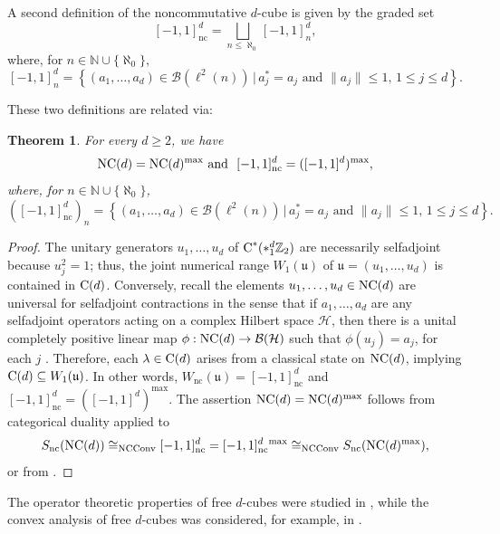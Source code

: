 \documentclass{amsart}
\newtheorem{theorem}{Theorem}[section]
\theoremstyle{definition}
\theoremstyle{remark}
\newcommand{\B}{\mathcal{B}}
\renewcommand{\H}{\mathcal{H}}
\newcommand\cstar{{\textrm C}^*}                              %
\numberwithin{equation}{section}
\begin{document}
A second definition of the noncommutative $d$-cube is given by
the graded set 
 \[
[-1,1]^d_{\textrm{nc}}=\bigsqcup_{n\leq\aleph_0} [-1,1]^d_n,
\]
where, for $n\in\mathbb N\cup\{\aleph_0\}$,
\[
[-1,1]^d_n=\left\{ (a_1,\dots,a_d)\in\B(\ell^2(n))\,|\,a_j^*=a_j\mbox{ and }\|a_j\|\leq 1, \, 1\leq j\leq d \right\}.
\]

These two definitions are related via:

\begin{theorem}\label{free d-cubes} For every $d\geq 2$, we have
\[
\mbox{\textrm{NC}}(d)=\mbox{\textrm{NC}}(d)^{\textrm{max}}
\mbox{ and }\
[-1,1]^d_{\textrm{nc}}=([-1,1]^d)^{\textrm{max}},
\]
where, for $n\in\mathbb N\cup\{\aleph_0\}$,
\[
([-1,1]^d_{\textrm{nc}})_n=\left\{ (a_1,\dots,a_d)\in\B(\ell^2(n))\,|\,a_j^*=a_j\mbox{ and }\|a_j\|\leq 1, \, 1\leq j\leq d \right\}.
\]
\end{theorem}

\begin{proof}
The unitary generators $u_1,\dots,u_d$ of $\cstar(*_1^d\mathbb Z_2)$ are necessarily selfadjoint
because $u_j^2=1$; thus, the joint numerical range $W_1(\mathfrak u)$ of $\mathfrak u=(u_1,\dots,u_d)$ is contained in $\mbox{\textrm C}(d)$. Conversely,
recall the
elements $u_1,\dots,u_d\in \mbox{\textrm{NC}}(d)$ are universal for selfadjoint contractions 
in the sense that if $a_1,\dots,a_d$ are any selfadjoint operators acting on a complex Hilbert space $\H$, then there is a unital completely positive
linear map $\phi:\mbox{\textrm{NC}}(d)\rightarrow\B(\H)$ 
such that $\phi(u_j)=a_j$, for each $j$ \cite[Proposition 4.1]{farenick--kavruk--paulsen--todorov2018}. Therefore, each $\lambda\in \mbox{\textrm C}(d)$
arises from a classical state on $ \mbox{\textrm{NC}}(d)$, implying $\mbox{\textrm C}(d)\subseteq W_1(\mathfrak u)$. In other words, 
$W_{\textrm{nc}}(\mathfrak u)=[-1,1]^d_{\textrm{nc}}$ and
$[-1,1]^d_{\textrm{nc}}=([-1,1]^d)^{\textrm{max}}$. The assertion $\mbox{\textrm{NC}}(d)=\mbox{\textrm{NC}}(d)^{\textrm{max}}$ follows from categorical duality 
applied to 
\[
S_{\textrm{nc}}(\mbox{\textrm{NC}}(d)) \cong_{\textrm{NCConv}} [-1,1]^d_{\textrm{nc}} =[-1,1]^d_{\textrm{nc}}{}^{\textrm{max}}\cong_{\textrm{NCConv}} 
S_{\textrm{nc}}(\mbox{\textrm{NC}}(d)^{\textrm{max}}),
\]
or from \cite[Proposition 6.13]{farenick--kavruk--paulsen--todorov2014}.
\end{proof}

The operator theoretic properties of free $d$-cubes were 
studied in \cite{farenick--kavruk--paulsen--todorov2014, farenick--kavruk--paulsen--todorov2018}, while the convex
analysis of free $d$-cubes was considered, for example, in \cite{evert--helton--klep--mccullough2018}. 
\end{document}
